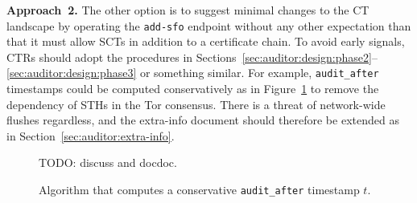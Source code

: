 \textbf{Approach~2.}  The other option is to suggest minimal changes to the CT
landscape by operating the \texttt{add-sfo} endpoint without any other
expectation than that it must allow SCTs in addition to a certificate chain.
To avoid early signals, CTRs should adopt the procedures in
Sections~\ref{sec:auditor:design:phase2}--\ref{sec:auditor:design:phase3}
or something similar.  For example, \texttt{audit\_after} timestamps
could be computed conservatively as in Figure~\ref{fig:audit-after-cons}
to remove the dependency of STHs in the Tor consensus.  There is a threat of
network-wide flushes regardless, and the extra-info document should therefore be
extended as in Section~\ref{sec:auditor:extra-info}.

%
%
\begin{figure}
	\centering
	TODO: discuss and docdoc.
	\caption{%
		Algorithm that computes a conservative \texttt{audit\_after} timestamp
		$t$.
	}
	\label{fig:audit-after-cons}
\end{figure}
